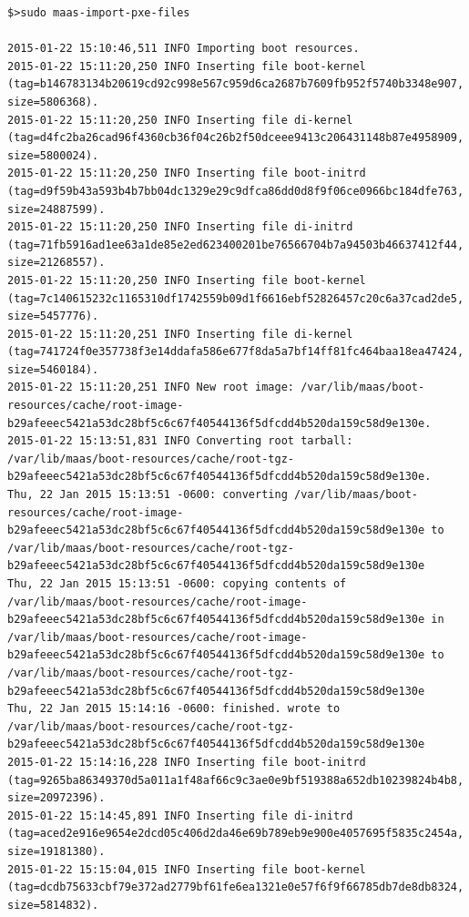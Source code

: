 {\tiny
\begin{verbatim}
$>sudo maas-import-pxe-files

2015-01-22 15:10:46,511 INFO Importing boot resources.
2015-01-22 15:11:20,250 INFO Inserting file boot-kernel (tag=b146783134b20619cd92c998e567c959d6ca2687b7609fb952f5740b3348e907, size=5806368).
2015-01-22 15:11:20,250 INFO Inserting file di-kernel (tag=d4fc2ba26cad96f4360cb36f04c26b2f50dceee9413c206431148b87e4958909, size=5800024).
2015-01-22 15:11:20,250 INFO Inserting file boot-initrd (tag=d9f59b43a593b4b7bb04dc1329e29c9dfca86dd0d8f9f06ce0966bc184dfe763, size=24887599).
2015-01-22 15:11:20,250 INFO Inserting file di-initrd (tag=71fb5916ad1ee63a1de85e2ed623400201be76566704b7a94503b46637412f44, size=21268557).
2015-01-22 15:11:20,250 INFO Inserting file boot-kernel (tag=7c140615232c1165310df1742559b09d1f6616ebf52826457c20c6a37cad2de5, size=5457776).
2015-01-22 15:11:20,251 INFO Inserting file di-kernel (tag=741724f0e357738f3e14ddafa586e677f8da5a7bf14ff81fc464baa18ea47424, size=5460184).
2015-01-22 15:11:20,251 INFO New root image: /var/lib/maas/boot-resources/cache/root-image-b29afeeec5421a53dc28bf5c6c67f40544136f5dfcdd4b520da159c58d9e130e.
2015-01-22 15:13:51,831 INFO Converting root tarball: /var/lib/maas/boot-resources/cache/root-tgz-b29afeeec5421a53dc28bf5c6c67f40544136f5dfcdd4b520da159c58d9e130e.
Thu, 22 Jan 2015 15:13:51 -0600: converting /var/lib/maas/boot-resources/cache/root-image-b29afeeec5421a53dc28bf5c6c67f40544136f5dfcdd4b520da159c58d9e130e to /var/lib/maas/boot-resources/cache/root-tgz-b29afeeec5421a53dc28bf5c6c67f40544136f5dfcdd4b520da159c58d9e130e
Thu, 22 Jan 2015 15:13:51 -0600: copying contents of /var/lib/maas/boot-resources/cache/root-image-b29afeeec5421a53dc28bf5c6c67f40544136f5dfcdd4b520da159c58d9e130e in /var/lib/maas/boot-resources/cache/root-image-b29afeeec5421a53dc28bf5c6c67f40544136f5dfcdd4b520da159c58d9e130e to /var/lib/maas/boot-resources/cache/root-tgz-b29afeeec5421a53dc28bf5c6c67f40544136f5dfcdd4b520da159c58d9e130e
Thu, 22 Jan 2015 15:14:16 -0600: finished. wrote to /var/lib/maas/boot-resources/cache/root-tgz-b29afeeec5421a53dc28bf5c6c67f40544136f5dfcdd4b520da159c58d9e130e
2015-01-22 15:14:16,228 INFO Inserting file boot-initrd (tag=9265ba86349370d5a011a1f48af66c9c3ae0e9bf519388a652db10239824b4b8, size=20972396).
2015-01-22 15:14:45,891 INFO Inserting file di-initrd (tag=aced2e916e9654e2dcd05c406d2da46e69b789eb9e900e4057695f5835c2454a, size=19181380).
2015-01-22 15:15:04,015 INFO Inserting file boot-kernel (tag=dcdb75633cbf79e372ad2779bf61fe6ea1321e0e57f6f9f66785db7de8db8324, size=5814832).

\end{verbatim}}
